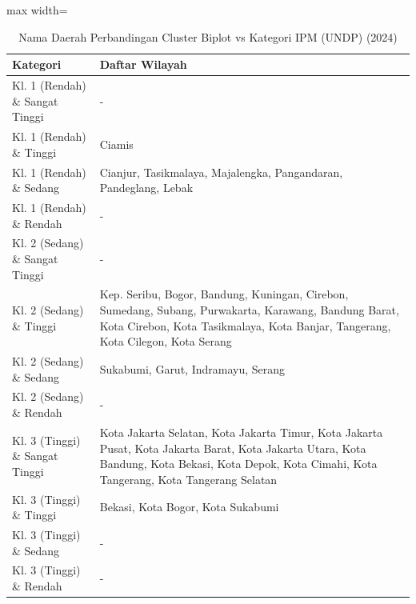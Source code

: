 \begin{table}[H]
\centering
\caption{Nama Daerah Perbandingan Cluster Biplot vs Kategori IPM (UNDP) (2024)} \label{tab:appcrossname2024}
\begin{adjustbox}{max width=\textwidth}
\begin{tabular}{|p{4cm}|p{10cm}|}
\hline
\textbf{Kategori} & \textbf{Daftar Wilayah} \\
\hline
Kl. 1 (Rendah) \& Sangat Tinggi & - \\
\hline
Kl. 1 (Rendah) \& Tinggi & Ciamis \\
\hline
Kl. 1 (Rendah) \& Sedang & Cianjur, Tasikmalaya, Majalengka, Pangandaran, Pandeglang, Lebak \\
\hline
Kl. 1 (Rendah) \& Rendah & - \\
\hline
Kl. 2 (Sedang) \& Sangat Tinggi & - \\
\hline
Kl. 2 (Sedang) \& Tinggi & Kep. Seribu, Bogor, Bandung, Kuningan, Cirebon, Sumedang, Subang, Purwakarta, Karawang, Bandung Barat, Kota Cirebon, Kota Tasikmalaya, Kota Banjar, Tangerang, Kota Cilegon, Kota Serang \\
\hline
Kl. 2 (Sedang) \& Sedang & Sukabumi, Garut, Indramayu, Serang \\
\hline
Kl. 2 (Sedang) \& Rendah & - \\
\hline
Kl. 3 (Tinggi) \& Sangat Tinggi & Kota Jakarta Selatan, Kota Jakarta Timur, Kota Jakarta Pusat, Kota Jakarta Barat, Kota Jakarta Utara, Kota Bandung, Kota Bekasi, Kota Depok, Kota Cimahi, Kota Tangerang, Kota Tangerang Selatan \\
\hline
Kl. 3 (Tinggi) \& Tinggi & Bekasi, Kota Bogor, Kota Sukabumi \\
\hline
Kl. 3 (Tinggi) \& Sedang & - \\
\hline
Kl. 3 (Tinggi) \& Rendah & - \\
\hline
\end{tabular}
\end{adjustbox}
\end{table}